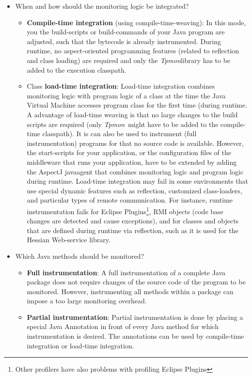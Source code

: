 \documentclass[a4paper,12pt]{scrartcl}
\newcommand{\tpmon}{\textit{Tpmon}}
\begin{document}
\begin{itemize}
 \item When and how should the monitoring logic be integrated?
\begin{itemize}
 \item \textbf{Compile-time integration} (using compile-time-weaving): In this mode, you the build-scripts or build-commands of your Java program are adjusted, such that the bytecode is already instrumented. During runtime, no aspect-oriented programming features (related to reflection and class loading) are required and only the \tpmon library has to be added to the execution classpath.
\item Class \textbf{load-time integration}: Load-time integration combines monitoring logic with program logic of a class at the time the Java Virtual Machine accesses program class for the first time (during runtime. A advantage of load-time weaving is that no large changes to the build scripts are required (only \tpmon\ might have to be added to the compile-time classpath). It is can also be used to instrument (full instrumentation) programs for that no source code is available. However, the start-scripts for your application, or the configuration files of the middleware that runs your application, have to be extended by adding the AspectJ javaagent that combines monitoring logic and program logic during runtime. Load-time integration may fail in some environments that use special dynamic features such as reflection, customized class-loaders, and particular types of remote communication. For instance, runtime instrumentation fails for Eclipse Plugins\footnote{Other profilers have also problems with profiling Eclipse Plugins}, RMI objects (code base changes are detected and cause exceptions), and for classes and objects that are defined during runtime via reflection, such as it is used for the Hessian Web-service library.
\end{itemize}
\item Which Java methods should be monitored?
\begin{itemize}
\item \textbf{Full instrumentation}: A full instrumentation of a complete Java package does not require changes of the source code of the program to be monitored. However, instrumenting all methods within a package can impose a too large monitoring overhead. 
\item \textbf{Partial instrumentation}: Partial instrumentation is done by placing a special Java Annotation in front of every Java method for which instrumentation is desired. The annotations can be used by compile-time integration or load-time integration. 

\end{itemize}
\end{itemize}
\end{document}
